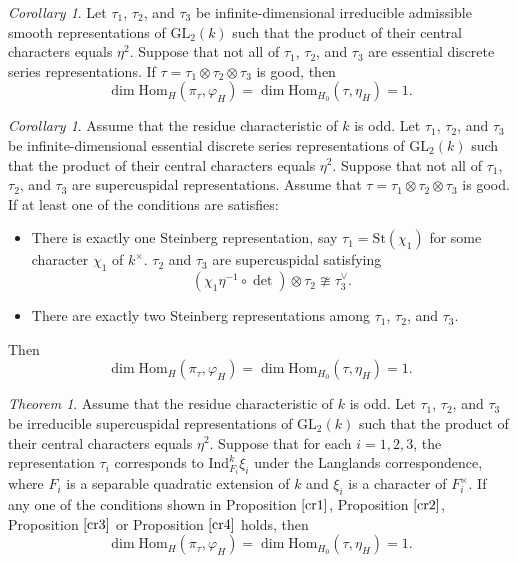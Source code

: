 \documentclass[12pt]{amsart}
\newcommand{\GL}{{\mathrm{GL}}}
\newcommand{\Hom}{{\mathrm{Hom}}}
\theoremstyle{Theorem}
\theoremstyle{Theorem}
\theoremstyle{Theorem}
\theoremstyle{Theorem}
\theoremstyle{Plain}
\theoremstyle{remark}
\theoremstyle{remark}
\theoremstyle{Definition}
\newtheorem{cord}[dfn]{Corollary}
\newtheorem{thmd}[dfn]{Theorem}
\begin{document}
\begin{cord}
    \label{mainthm2}
    Let $\tau_1$, $\tau_2$, and $\tau_3$ be infinite-dimensional irreducible admissible smooth representations of $\GL_2(k)$ such that the product of their central characters equals $\eta^2$. Suppose that not all of $\tau_1$, $\tau_2$, and $\tau_3$ are essential discrete series representations. If $ \tau = \tau_1 \otimes \tau_2 \otimes \tau_3 $ is good, then
    \[
        \dim \Hom_H \left( \pi_\tau, \varphi_H \right) = \dim \Hom_{H_0} ( \tau, \eta_H ) = 1.
    \]
\end{cord}

\begin{cord}
    \label{mainthm4}
    Assume that the residue characteristic of $k$ is odd. Let $\tau_1$, $\tau_2$, and $\tau_3$ be infinite-dimensional essential discrete series representations of $\GL_2(k)$ such that the product of their central characters equals $\eta^2$. Suppose that not all of $\tau_1$, $\tau_2$, and $\tau_3$ are supercuspidal representations. Assume that $ \tau = \tau_1 \otimes \tau_2 \otimes \tau_3 $ is good. If at least one of the conditions are satisfies:
    \begin{itemize}
        \item There is exactly one Steinberg representation, say $ \tau_1 = \mathrm{St}( \chi_1 ) $ for some character $\chi_1$ of $k^\times$. $\tau_2$ and $\tau_3$ are supercuspidal satisfying
        \[
            ( \chi_1 \eta^{-1} \circ \det ) \otimes \tau_2 \ncong \tau_3^\vee.
        \]
        \item There are exactly two Steinberg representations among $\tau_1$, $\tau_2$, and $\tau_3$. 
    \end{itemize}
    Then
    \[
        \dim \Hom_H \left( \pi_\tau, \varphi_H \right) = \dim \Hom_{H_0} ( \tau, \eta_H ) = 1.
    \]
\end{cord}

\begin{thmd}
    \label{mainthm3}
    Assume that the residue characteristic of $k$ is odd. Let $\tau_1$, $\tau_2$, and $\tau_3$ be  irreducible supercuspidal representations of $\GL_2(k)$ such that the product of their central characters equals $\eta^2$. Suppose that for each $i=1,2,3$, the representation $\tau_i$ corresponds to $ \mathrm{Ind}^k_{F_i} \xi_i $ under the Langlands correspondence, where $F_i$ is a separable quadratic extension of $k$ and $\xi_i$ is a character of $F_i^\times$. If any one of the conditions shown in Proposition $ \ref{cr1} $, Proposition $\ref{cr2}$, Proposition $\ref{cr3}$ or Proposition $\ref{cr4}$ holds, then
    \[
        \dim \Hom_H \left( \pi_\tau, \varphi_H \right) = \dim \Hom_{H_0} ( \tau, \eta_H ) = 1.
    \]
\end{thmd}
    
\end{document}

